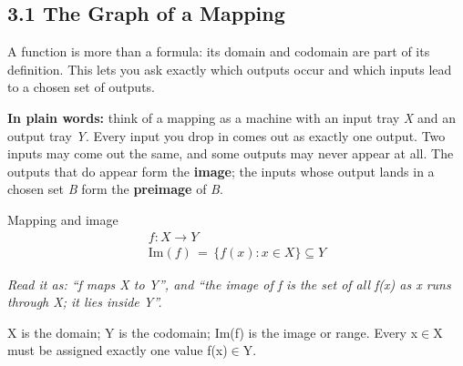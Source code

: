 \documentclass[11pt]{article}
\begin{document}
\begin{keepsection}
\section{3.1 The Graph of a Mapping}

A function is more than a formula: its domain and codomain are part of its definition. This lets you ask exactly which outputs occur and which inputs lead to a chosen set of outputs.

\begin{plainbox}\textbf{In plain words:} think of a mapping as a machine with an input tray \textit{X} and an output tray \textit{Y}. Every input you drop in comes out as exactly one output. Two inputs may come out the same, and some outputs may never appear at all. The outputs that do appear form the \textbf{image}; the inputs whose output lands in a chosen set \textit{B} form the \textbf{preimage} of \textit{B}.\end{plainbox}

\begin{equationcard}{Mapping and image}
\[ \begin{gathered} {f}:{X}\to {Y} \\ \text{Im}({f})\, =\, \{{f}({x}):{x}\in {X}\}⊆{Y} \end{gathered} \]
{\small \emph{Read it as: “f maps X to Y”, and “the image of f is the set of all f(x) as x runs through X; it lies inside Y”.}\par X is the domain; Y is the codomain; Im(f) is the image or range. Every x\ensuremath{\in}X must be assigned exactly one value f(x)\ensuremath{\in}Y.}
\end{equationcard}


\end{keepsection}
\end{document}
